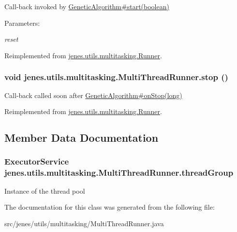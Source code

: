 Call-back invoked by \hyperlink{}{GeneticAlgorithm\#start(boolean)} \begin{Desc}
\item[Parameters:]
\begin{description}
\item[{\em reset}]\end{description}
\end{Desc}


Reimplemented from \hyperlink{classjenes_1_1utils_1_1multitasking_1_1_runner_5dc1ed49495150ff26ec5194010b00e4}{jenes.utils.multitasking.Runner}.\hypertarget{classjenes_1_1utils_1_1multitasking_1_1_multi_thread_runner_5f00a9b63ff1322d586ad62ec060d597}{
\subsubsection[stop]{\setlength{\rightskip}{0pt plus 5cm}void jenes.utils.multitasking.MultiThreadRunner.stop ()}}
\label{classjenes_1_1utils_1_1multitasking_1_1_multi_thread_runner_5f00a9b63ff1322d586ad62ec060d597}


Call-back called soon after \hyperlink{}{GeneticAlgorithm\#onStop(long)} 

Reimplemented from \hyperlink{classjenes_1_1utils_1_1multitasking_1_1_runner_c89e8ac54daba2e326e687662ff9f7b0}{jenes.utils.multitasking.Runner}.

\subsection{Member Data Documentation}
\hypertarget{classjenes_1_1utils_1_1multitasking_1_1_multi_thread_runner_fd9939cc7a261bd4bb6c8f3de6f58337}{
\subsubsection[threadGroup]{\setlength{\rightskip}{0pt plus 5cm}ExecutorService {\bf jenes.utils.multitasking.MultiThreadRunner.threadGroup}}}
\label{classjenes_1_1utils_1_1multitasking_1_1_multi_thread_runner_fd9939cc7a261bd4bb6c8f3de6f58337}


Instance of the thread pool 

The documentation for this class was generated from the following file:\begin{CompactItemize}
\item 
src/jenes/utils/multitasking/MultiThreadRunner.java\end{CompactItemize}
